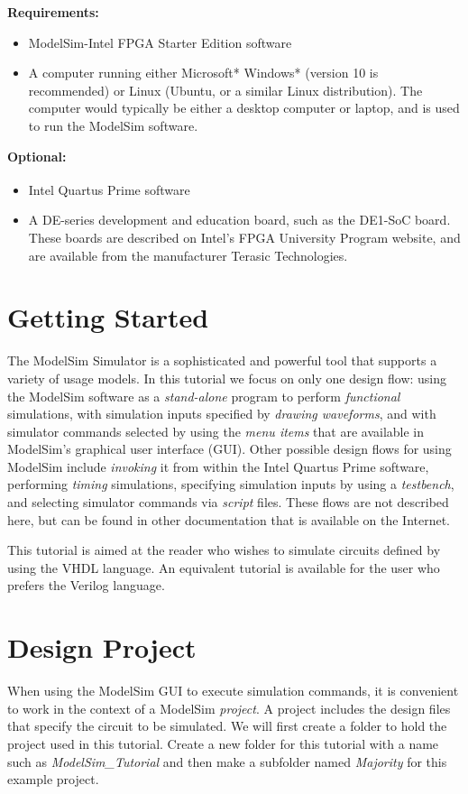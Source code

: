 \documentclass[11pt, twoside, pdftex]{article}
\begin{document}
{\bf Requirements:}
\begin{itemize}
\item ModelSim-Intel FPGA Starter Edition software
\item A computer running either Microsoft* Windows* (version 10 is recommended) or Linux 
(Ubuntu, or a similar Linux distribution). The computer would typically be either a
desktop computer or laptop, and is used to run the ModelSim software.
\end{itemize}

{\bf Optional:}
\begin{itemize}
\item Intel Quartus\textsuperscript{\textregistered} Prime software
\item A DE-series development and education board, such as the DE1-SoC board. These boards are 
described on Intel's FPGA University Program website, and are available from the manufacturer 
Terasic Technologies.
\end{itemize}
\clearpage
\newpage
\section{Getting Started}

The ModelSim Simulator is a sophisticated and powerful tool that supports a variety of 
usage models. In this tutorial we focus on only one design flow: using the ModelSim
software as a {\it stand-alone} program to perform {\it functional} simulations, with 
simulation inputs specified by {\it drawing waveforms}, and with simulator commands selected 
by using the {\it menu items} that are available in ModelSim's graphical user interface
(GUI).  Other possible design flows for using ModelSim include {\it invoking} it from within the 
Intel Quartus Prime software, performing {\it timing} simulations, specifying simulation 
inputs by using a {\it testbench}, and selecting simulator commands via {\it script} files.
These flows are not described here, but can be found in other
documentation that is available on the Internet.  

This tutorial is aimed at the reader who wishes to simulate circuits defined
by using the VHDL language. An equivalent tutorial is
available for the user who prefers the Verilog language.
 
\section{Design Project}
When using the ModelSim GUI to execute simulation commands, it is convenient to work in the
context of a ModelSim {\it project}. A project includes the design files that specify the 
circuit to be simulated. We will first create a folder to hold the project used 
in this tutorial.  Create a new folder for this tutorial with a name such as
{\it ModelSim\_Tutorial} and then make a subfolder named {\it Majority} for this 
example project.
\end{document}
